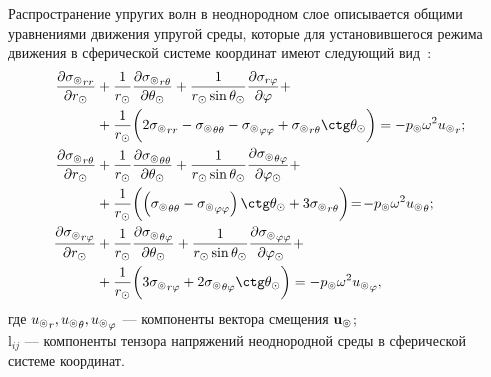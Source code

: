 Распространение упругих волн в неоднородном слое описывается общими уравнениями движения упругой среды, которые для установившегося режима движения в сферической системе координат имеют следующий вид~\cite{Nowacki}:
\begin{equation}\label{eq_moving}
\begin{split}
\fr{\de{\si\l}_{rr}}{\de r\s} &+ \fr1{r\s} \fr{\de{\si\l}_{r\Q}}{\de\Q\s} + \fr{1}{r\s\sin\Q\s}\fr{\de\si_{r\f}}{\de\f} +\\
&+ \fr1{r\s}\biggl(2{\si\l}_{rr}-{\si\l}_{\Q\Q}-{\si\l}_{\f\f}+{\si\l}_{r\Q}\ctg\Q\s\biggr)=-p\l\om^2{u\l}_r;\\
\fr{\de{\si\l}_{r\Q}}{\de r\s} &+ \fr1{r\s} \fr{\de{\si\l}_{\Q\Q}}{\de\Q\s} + \fr{1}{r\s\sin\Q\s}\fr{\de{\si\l}_{\Q\f}}{\de\f\s} +\\
&+ \fr1{r\s}\biggl(\left({\si\l}_{\Q\Q}-{\si\l}_{\f\f}\right)\ctg\Q\s+3{\si\l}_{r\Q}\biggr)\!=\!-p\l\om^2{u\l}_\Q;\\
\fr{\de{\si\l}_{r\f}}{\de r\s} &+ \fr1{r\s} \fr{\de{\si\l}_{\Q\f}}{\de\Q\s} + \fr{1}{r\s\sin\Q\s}\fr{\de{\si\l}_{\f\f}}{\de\f\s} +\\
&+ \fr1{r\s}\biggl(3{\si\l}_{r\f}+2{\si\l}_{\Q\f}\ctg\Q\s\biggr)=-p\l\om^2{u\l}_\f,
\end{split}
\end{equation}
где ${u_\circledcirc}_r, {u_\circledcirc}_\theta, {u_\circledcirc}_\varphi$ --- компоненты вектора смещения $\mathbf{u_\circledcirc}$;\\
${\si\l}_{ij}$ --- компоненты тензора напряжений неоднородной среды в сферической системе координат.

